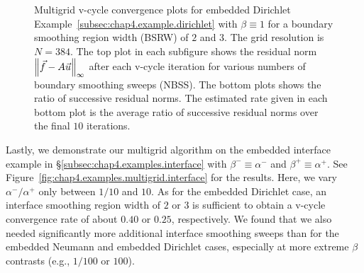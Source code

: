 \setlength{\figurewidth}{0.50\textwidth}
\begin{figure}[htbp]
\centering
{}
\caption{Multigrid v-cycle convergence plots for embedded Dirichlet Example~\ref{subsec:chap4.example.dirichlet} with $\beta \equiv 1$ for a boundary smoothing region width (BSRW) of $2$ and $3$. The grid resolution is $N = 384$. The top plot in each subfigure shows the residual norm $\left\lVert  \vec{f} - A\vec{u}  \right\rVert_{\infty}$ after each v-cycle iteration for various numbers of boundary smoothing sweeps (NBSS). The bottom plots shows the ratio of successive residual norms. The estimated rate given in each bottom plot is the average ratio of successive residual norms over the final $10$ iterations.}
\label{fig:chap4.examples.multigrid.dirichlet}
\end{figure}

Lastly, we demonstrate our multigrid algorithm on the embedded interface example in \S\ref{subsec:chap4.examples.interface} with $\beta^- \equiv \alpha^-$ and $\beta^+ \equiv \alpha^+$. See Figure~\ref{fig:chap4.examples.multigrid.interface} for the results. Here, we vary $\alpha^- / \alpha^+$ only between $1/10$ and $10$. As for the embedded Dirichlet case, an interface smoothing region width of $2$ or $3$ is sufficient to obtain a v-cycle convergence rate of about $0.40$ or $0.25$, respectively. We found that we also needed significantly more additional interface smoothing sweeps than for the embedded Neumann and embedded Dirichlet cases, especially at more extreme $\beta$ contrasts (e.g., $1/100$ or $100$).

